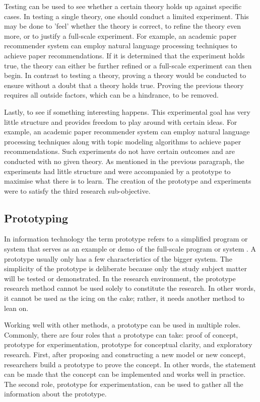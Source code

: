 Testing can be used to see whether a certain theory holds up against specific cases. In testing a single theory, one should conduct a limited experiment. This may be done to ’feel’ whether the theory is correct, to refine the theory even more, or to justify a full-scale experiment. For example, an academic paper recommender system can employ natural language processing techniques to achieve paper recommendations. If it is determined that the experiment holds true, the theory can either be further refined or a full-scale experiment can then begin. In contrast to testing a theory, proving a theory would be conducted to ensure without a doubt that a theory holds true. Proving the previous theory requires all outside factors, which can be a hindrance, to be removed.

Lastly, to see if something interesting happens. This experimental goal has very little structure and provides freedom to play around with certain ideas. For example, an academic paper recommender system can employ natural language processing techniques along with topic modeling algorithms to achieve paper recommendations. Such experiments do not have certain outcomes and are conducted with no given theory. As mentioned in the previous paragraph, the experiments had little structure and were accompanied by a prototype to maximise what there is to learn. The creation of the prototype and experiments were to satisfy the third research sub-objective.

\subsection{Prototyping} \label{ssec:prot}

In information technology the term prototype refers to a simplified program or system that serves as an example or demo of the full-scale program or system \cite{olivier2009information}. A prototype usually only has a few characteristics of the bigger system. The simplicity of the prototype is deliberate because only the study subject matter will be tested or demonstrated. In the research environment, the prototype research method cannot be used solely to constitute the research. In other words, it cannot be used as the icing on the cake; rather, it needs another method to lean on.

Working well with other methods, a prototype can be used in multiple roles. Commonly, there are four roles that a prototype can take: proof of concept, prototype for experimentation, prototype for conceptual clarity, and exploratory research. First, after proposing and constructing a new model or new concept, researchers build a prototype to prove the concept. In other words, the statement can be made that the concept can be implemented and works well in practice. The second role, prototype for experimentation, can be used to gather all the information about the prototype.

